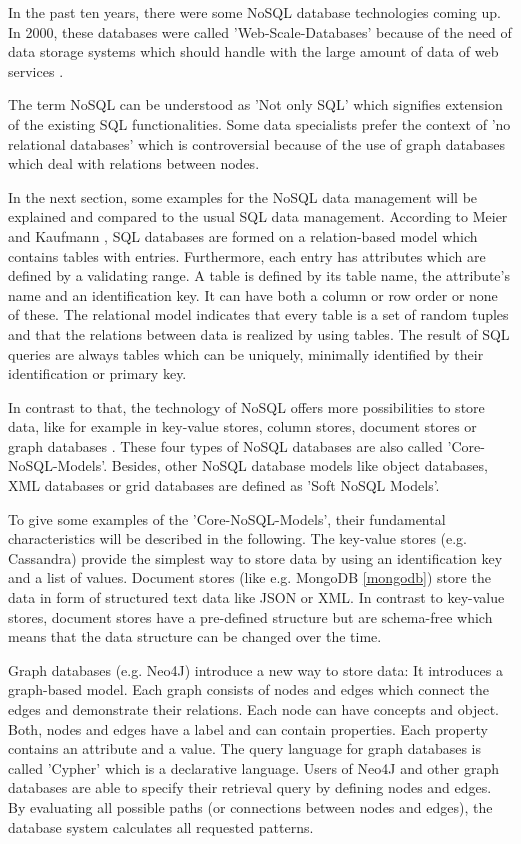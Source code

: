 In the past ten years, there were some NoSQL database technologies coming up. In 2000, these databases were called 'Web-Scale-Databases' because of the need of data storage systems which should handle with the large amount of data of web services \cite[p.221 ff.]{nosql_meier}.

The term NoSQL can be understood as 'Not only SQL' which signifies extension of the existing SQL functionalities. Some data specialists prefer the context of 'no relational databases' which is controversial because of the use of graph databases which deal with relations between nodes.   

In the next section, some examples for the NoSQL data management will be explained and compared to the usual SQL data management. According to Meier and Kaufmann \cite[p.3 ff.]{nosql_meier}, SQL databases are formed on a relation-based model which contains tables with entries. Furthermore, each entry has attributes which are defined by a validating range. A table is defined by its table name, the attribute's name and an identification key. It can have both a column or row order or none of these. The relational model indicates that every table is a set of random tuples and that the relations between data is realized by using tables. The result of SQL queries are always tables which can be uniquely, minimally identified by their identification or primary key.

In contrast to that, the technology of NoSQL offers more possibilities to store data, like for example in key-value stores, column stores, document stores or graph databases \cite[p.16 ff.]{nosql_meier}. These four types of NoSQL databases are also called 'Core-NoSQL-Models'. Besides, other NoSQL database models like object databases, \ac{XML} databases or grid databases are defined as 'Soft NoSQL Models'. 

To give some examples of the 'Core-NoSQL-Models', their fundamental characteristics will be described in the following. The key-value stores (e.g. Cassandra) provide the simplest way to store data by using an identification key and a list of values. Document stores (like e.g. MongoDB \ref{mongodb}) store the data in form of structured text data like \ac{JSON} or XML. In contrast to key-value stores, document stores have a pre-defined structure but are schema-free which means that the data structure can be changed over the time. 

Graph databases (e.g. Neo4J) introduce a new way to store data: It introduces a graph-based model. Each graph consists of nodes and edges which connect the edges and demonstrate their relations. Each node can have concepts and object. Both, nodes and edges have a label and can contain properties. Each property contains an attribute and a value. The query language for graph databases is called 'Cypher' \cite[p.16 ff.]{nosql_meier} which is a declarative language. Users of Neo4J and other graph databases are able to specify their retrieval query by defining nodes and edges. By evaluating all possible paths (or connections between nodes and edges), the database system calculates all requested patterns.   

